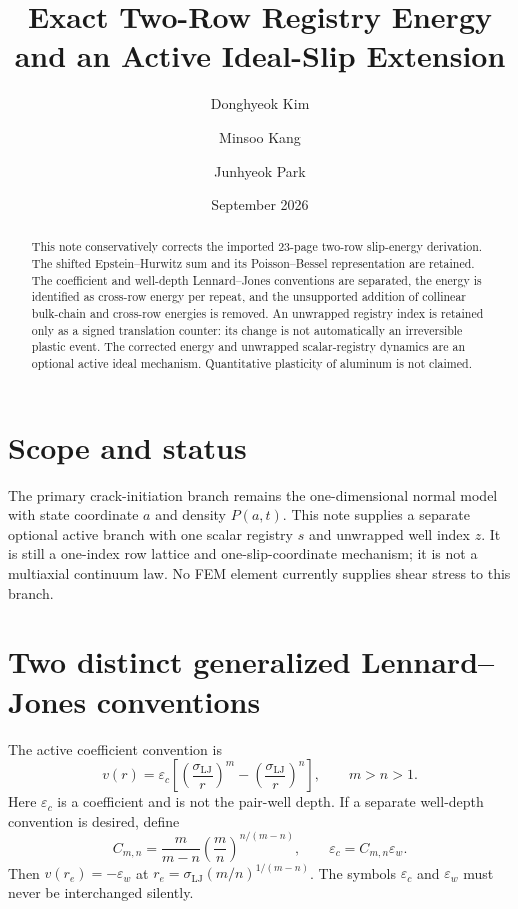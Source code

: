 \documentclass[11pt]{article}
\title{Exact Two-Row Registry Energy and an Active Ideal-Slip Extension}
\author{Donghyeok Kim \and Minsoo Kang \and Junhyeok Park}
\date{September 2026}
\newcommand{\epsc}{\varepsilon_c}
\newcommand{\epsw}{\varepsilon_w}
\newcommand{\sigLJ}{\sigma_{\mathrm{LJ}}}
\begin{document}
\maketitle

\begin{center}\end{center}

\begin{abstract}
This note conservatively corrects the imported 23-page two-row slip-energy
derivation. The shifted Epstein--Hurwitz sum and its Poisson--Bessel
representation are retained. The coefficient and well-depth Lennard--Jones
conventions are separated, the energy is identified as cross-row energy per
repeat, and the unsupported addition of collinear bulk-chain and cross-row
energies is removed. An unwrapped registry index is retained only as a signed
translation counter: its change is not automatically an irreversible plastic
event. The corrected energy and unwrapped scalar-registry dynamics are an
optional active ideal mechanism. Quantitative plasticity of aluminum is not
claimed.
\end{abstract}

\section{Scope and status}

The primary crack-initiation branch remains the one-dimensional normal model
with state coordinate $a$ and density $P(a,t)$. This note supplies a separate
optional active branch with one scalar registry $s$ and unwrapped well index
$z$. It is still a one-index row lattice and one-slip-coordinate mechanism;
it is not a multiaxial continuum law. No FEM element currently supplies shear
stress to this branch.

\section{Two distinct generalized Lennard--Jones conventions}

The active coefficient convention is
\begin{equation}
v(r)=\epsc\left[\left(\frac{\sigLJ}{r}\right)^m
-\left(\frac{\sigLJ}{r}\right)^n\right],\qquad m>n>1.
\end{equation}
Here $\epsc$ is a coefficient and is not the pair-well depth. If a separate
well-depth convention is desired, define
\begin{equation}
C_{m,n}=\frac{m}{m-n}\left(\frac{m}{n}\right)^{n/(m-n)},
\qquad \epsc=C_{m,n}\epsw.
\end{equation}
Then $v(r_e)=-\epsw$ at
$r_e=\sigLJ(m/n)^{1/(m-n)}$. The symbols $\epsc$ and $\epsw$ must never be
interchanged silently.
\end{document}
